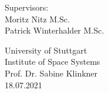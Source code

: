 \begin{titlepage}
\begin{textblock*}{117mm}
\begin{center}
			
			\vspace{10mm}
			
			Supervisors: \\
			Moritz Nitz M.Sc. \\
			Patrick Winterhalder M.Sc. 
			
			\vspace{10mm}
			
			University of Stuttgart \\
			Institute of Space Systems \\
			Prof. Dr. Sabine Klinkner \\
			18.07.2021
			
		\end{center}
	
	\end{textblock*}
	
\end{titlepage}




